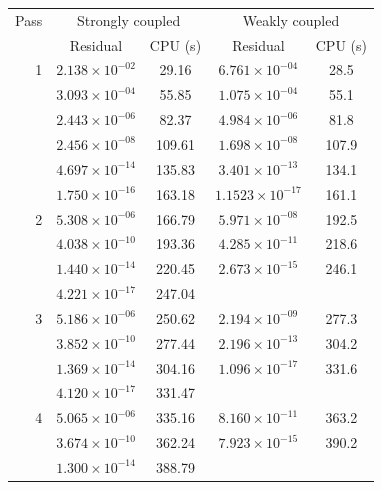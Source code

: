 \begin{table}
\centering
\begin{tabular}{|r|c|c|c|c|}
  \hline
  Pass & \multicolumn{2}{c|}{Strongly coupled} &
         \multicolumn{2}{c|}{Weakly coupled}\\
  \cline{2-5} & Residual & CPU (s) & Residual & CPU (s)\\
  \hline\hline 
1     & $ 2.138\times 10^{-02}$ &   29.16   & $6.761 \times 10^{-04}$  &    28.5 \\
      & $ 3.093\times 10^{-04}$ &   55.85   & $1.075 \times 10^{-04}$  &    55.1 \\
      & $ 2.443\times 10^{-06}$ &   82.37   & $4.984 \times 10^{-06}$  &    81.8 \\
      & $ 2.456\times 10^{-08}$ &  109.61   & $1.698 \times 10^{-08}$  &   107.9 \\
      & $ 4.697\times 10^{-14}$ &  135.83   & $3.401 \times 10^{-13}$  &   134.1 \\
      & $ 1.750\times 10^{-16}$ &  163.18   & $1.1523\times 10^{-17}$  &   161.1 \\
\hline                                    
2     & $ 5.308\times 10^{-06}$ &  166.79   & $5.971 \times 10^{-08}$  &  192.5  \\
      & $ 4.038\times 10^{-10}$ &  193.36   & $4.285 \times 10^{-11}$  &  218.6  \\
      & $ 1.440\times 10^{-14}$ &  220.45   & $2.673 \times 10^{-15}$  &  246.1  \\
      & $ 4.221\times 10^{-17}$ &  247.04   & $                    $   &  \\
\hline                                    
3     & $ 5.186\times 10^{-06}$ &  250.62   & $2.194 \times 10^{-09}$  &  277.3  \\
      & $ 3.852\times 10^{-10}$ &  277.44   & $2.196 \times 10^{-13}$  &  304.2   \\
      & $ 1.369\times 10^{-14}$ &  304.16   & $1.096 \times 10^{-17}$  &  331.6   \\
      & $ 4.120\times 10^{-17}$ &  331.47   & $                    $   &  \\
\hline                                    
4     & $ 5.065\times 10^{-06}$ &  335.16   & $8.160 \times 10^{-11}$  &  363.2 \\ 
      & $ 3.674\times 10^{-10}$ &  362.24   & $7.923 \times 10^{-15}$  &  390.2 \\
      & $ 1.300\times 10^{-14}$ &  388.79   & $                    $   &  \\

\end{tabular}
\end{table}
